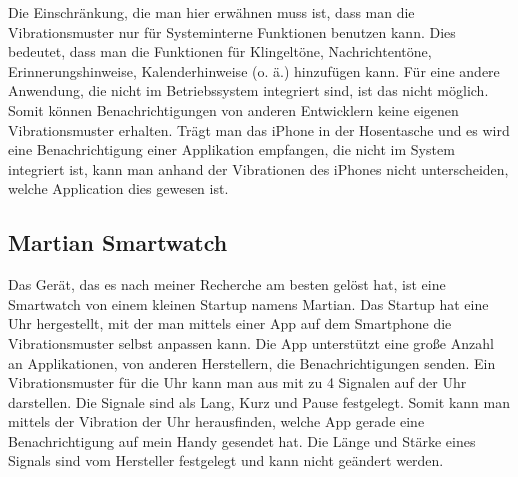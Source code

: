 Die Einschr{\"a}nkung, die man hier erw{\"a}hnen muss ist, dass man die Vibrationsmuster nur f{\"u}r Systeminterne Funktionen benutzen kann. 
Dies bedeutet, dass man die Funktionen f{\"u}r Klingelt{\"o}ne, Nachrichtent{\"o}ne, Erinnerungshinweise, Kalenderhinweise (o. {\"a}.) hinzuf{\"u}gen kann. 
F{\"u}r eine andere Anwendung, die nicht im Betriebssystem integriert sind, ist das nicht m{\"o}glich. 
Somit k{\"o}nnen Benachrichtigungen von anderen Entwicklern keine eigenen Vibrationsmuster erhalten. 
Tr{\"a}gt man das iPhone in der Hosentasche und es wird eine Benachrichtigung einer Applikation empfangen, die nicht im System integriert ist, kann man anhand der Vibrationen des iPhones nicht unterscheiden, welche Application dies gewesen ist.

\subsection{Martian Smartwatch}
\label{ch:Grundlagen:sec:RelatedWork:subsec:PersonalisierteSmartwatch}


Das Ger{\"a}t, das es nach meiner Recherche am besten gel{\"o}st hat, ist eine Smartwatch von einem kleinen Startup namens Martian. 
Das Startup hat eine Uhr hergestellt, mit der man mittels einer App auf dem Smartphone die Vibrationsmuster selbst anpassen kann. 
Die App unterst{\"u}tzt eine gro{\ss}e Anzahl an Applikationen, von anderen Herstellern, die Benachrichtigungen senden. 
Ein Vibrationsmuster f{\"u}r die Uhr kann man aus mit zu 4 Signalen auf der Uhr darstellen. 
Die Signale sind als Lang, Kurz und Pause festgelegt. 
Somit kann man mittels der Vibration der Uhr herausfinden, welche App gerade eine Benachrichtigung auf mein Handy gesendet hat. 
Die L{\"a}nge und St{\"a}rke eines Signals sind vom Hersteller festgelegt und kann nicht ge{\"a}ndert werden.

